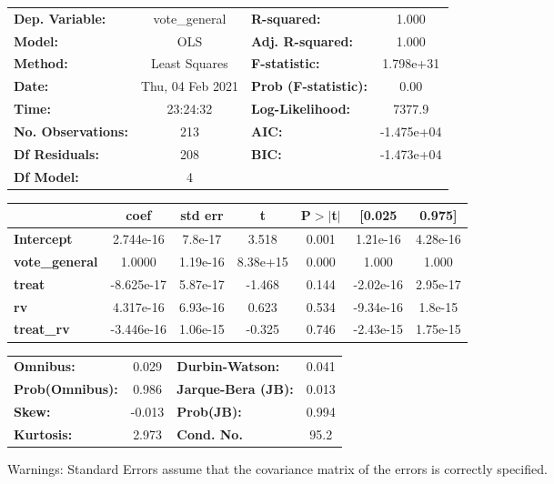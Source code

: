 \documentclass{report}
\begin{document}
\begin{center}
\begin{tabular}{lclc}
\toprule
\textbf{Dep. Variable:}    &  vote\_general   & \textbf{  R-squared:         } &     1.000   \\
\textbf{Model:}            &       OLS        & \textbf{  Adj. R-squared:    } &     1.000   \\
\textbf{Method:}           &  Least Squares   & \textbf{  F-statistic:       } & 1.798e+31   \\
\textbf{Date:}             & Thu, 04 Feb 2021 & \textbf{  Prob (F-statistic):} &     0.00    \\
\textbf{Time:}             &     23:24:32     & \textbf{  Log-Likelihood:    } &    7377.9   \\
\textbf{No. Observations:} &         213      & \textbf{  AIC:               } & -1.475e+04  \\
\textbf{Df Residuals:}     &         208      & \textbf{  BIC:               } & -1.473e+04  \\
\textbf{Df Model:}         &           4      & \textbf{                     } &             \\
\bottomrule
\end{tabular}
\begin{tabular}{lcccccc}
                       & \textbf{coef} & \textbf{std err} & \textbf{t} & \textbf{P$> |$t$|$} & \textbf{[0.025} & \textbf{0.975]}  \\
\midrule
\textbf{Intercept}     &    2.744e-16  &      7.8e-17     &     3.518  &         0.001        &     1.21e-16    &     4.28e-16     \\
\textbf{vote\_general} &       1.0000  &     1.19e-16     &  8.38e+15  &         0.000        &        1.000    &        1.000     \\
\textbf{treat}         &   -8.625e-17  &     5.87e-17     &    -1.468  &         0.144        &    -2.02e-16    &     2.95e-17     \\
\textbf{rv}            &    4.317e-16  &     6.93e-16     &     0.623  &         0.534        &    -9.34e-16    &      1.8e-15     \\
\textbf{treat\_rv}     &   -3.446e-16  &     1.06e-15     &    -0.325  &         0.746        &    -2.43e-15    &     1.75e-15     \\
\bottomrule
\end{tabular}
\begin{tabular}{lclc}
\textbf{Omnibus:}       &  0.029 & \textbf{  Durbin-Watson:     } &    0.041  \\
\textbf{Prob(Omnibus):} &  0.986 & \textbf{  Jarque-Bera (JB):  } &    0.013  \\
\textbf{Skew:}          & -0.013 & \textbf{  Prob(JB):          } &    0.994  \\
\textbf{Kurtosis:}      &  2.973 & \textbf{  Cond. No.          } &     95.2  \\
\bottomrule
\end{tabular}
\end{center}

Warnings: \newline
 [1] Standard Errors assume that the covariance matrix of the errors is correctly specified.
\end{document}
